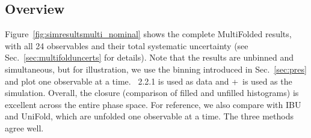 \label{sec:resultsMulti}

\subsection{Overview}

Figure~\ref{fig:simresultsmulti_nominal} shows the complete MultiFolded results, with all 24 observables and their total systematic uncertainty (see Sec.~\ref{sec:multifolduncerts} for details).  Note that the results are unbinned and simultaneous, but for illustration, we use the binning introduced in Sec.~\ref{sec:pres} and plot one observable at a time. \sherpa~2.2.1 is used as data and \powheg+\pythia~is used as the simulation.  Overall, the closure (comparison of filled and unfilled histograms) is excellent across the entire phase space.  For reference, we also compare with IBU and UniFold, which are unfolded one observable at a time.  The three methods agree well.

